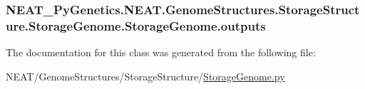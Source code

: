 \subsubsection[{\texorpdfstring{outputs}{outputs}}]{\setlength{\rightskip}{0pt plus 5cm}N\+E\+A\+T\+\_\+\+Py\+Genetics.\+N\+E\+A\+T.\+Genome\+Structures.\+Storage\+Structure.\+Storage\+Genome.\+Storage\+Genome.\+outputs\hspace{0.3cm}{\ttfamily [static]}}\hypertarget{classNEAT__PyGenetics_1_1NEAT_1_1GenomeStructures_1_1StorageStructure_1_1StorageGenome_1_1StorageGenome_a69f429018a927d4919d4468054cf49ea}{}\label{classNEAT__PyGenetics_1_1NEAT_1_1GenomeStructures_1_1StorageStructure_1_1StorageGenome_1_1StorageGenome_a69f429018a927d4919d4468054cf49ea}


The documentation for this class was generated from the following file\+:\begin{DoxyCompactItemize}
\item 
N\+E\+A\+T/\+Genome\+Structures/\+Storage\+Structure/\hyperlink{StorageGenome_8py}{Storage\+Genome.\+py}\end{DoxyCompactItemize}
